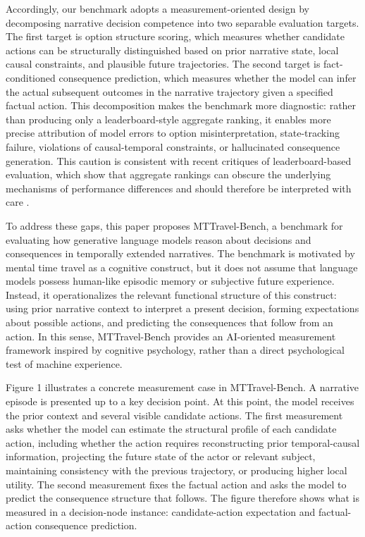 \documentclass[pdflatex,sn-mathphys-num]{sn-jnl}%
\theoremstyle{thmstyleone}%
\theoremstyle{thmstyletwo}%
\theoremstyle{thmstylethree}%
\begin{document}
Accordingly, our benchmark adopts a measurement-oriented design by decomposing narrative decision competence into two separable evaluation targets. The first target is option structure scoring, which measures whether candidate actions can be structurally distinguished based on prior narrative state, local causal constraints, and plausible future trajectories. The second target is fact-conditioned consequence prediction, which measures whether the model can infer the actual subsequent outcomes in the narrative trajectory given a specified factual action. This decomposition makes the benchmark more diagnostic: rather than producing only a leaderboard-style aggregate ranking, it enables more precise attribution of model errors to option misinterpretation, state-tracking failure, violations of causal-temporal constraints, or hallucinated consequence generation. This caution is consistent with recent critiques of leaderboard-based evaluation, which show that aggregate rankings can obscure the underlying mechanisms of performance differences and should therefore be interpreted with care \cite{singh2025leaderboard,blackwell2024reproducible,madaan2024quantifying}.

To address these gaps, this paper proposes MTTravel-Bench, a benchmark for evaluating how generative language models reason about decisions and consequences in temporally extended narratives. The benchmark is motivated by mental time travel as a cognitive construct, but it does not assume that language models possess human-like episodic memory or subjective future experience. Instead, it operationalizes the relevant functional structure of this construct: using prior narrative context to interpret a present decision, forming expectations about possible actions, and predicting the consequences that follow from an action. In this sense, MTTravel-Bench provides an AI-oriented measurement framework inspired by cognitive psychology, rather than a direct psychological test of machine experience.

Figure 1 illustrates a concrete measurement case in MTTravel-Bench. A narrative episode is presented up to a key decision point. At this point, the model receives the prior context and several visible candidate actions. The first measurement asks whether the model can estimate the structural profile of each candidate action, including whether the action requires reconstructing prior temporal-causal information, projecting the future state of the actor or relevant subject, maintaining consistency with the previous trajectory, or producing higher local utility. The second measurement fixes the factual action and asks the model to predict the consequence structure that follows. The figure therefore shows what is measured in a decision-node instance: candidate-action expectation and factual-action consequence prediction.
\end{document}
